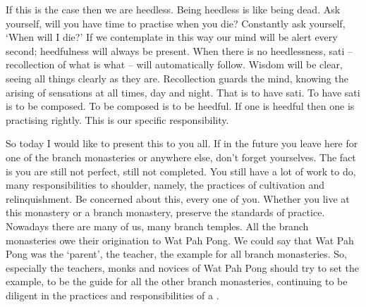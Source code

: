 If this is the case then we are heedless. Being heedless is like being dead. Ask yourself, will you have time to practise when you die? Constantly ask yourself, `When will I die?' If we contemplate in this way our mind will be alert every second; heedfulness will always be present. When there is no heedlessness, sati -- recollection of what is what -- will automatically follow. Wisdom will be clear, seeing all things clearly as they are. Recollection guards the mind, knowing the arising of sensations at all times, day and night. That is to have sati. To have sati is to be composed. To be composed is to be heedful. If one is heedful then one is practising rightly. This is our specific responsibility. 

So today I would like to present this to you all. If in the future you leave here for one of the branch monasteries or anywhere else, don't forget yourselves. The fact is you are still not perfect, still not completed. You still have a lot of work to do, many responsibilities to shoulder, namely, the practices of cultivation and relinquishment. Be concerned about this, every one of you. Whether you live at this monastery or a branch monastery, preserve the standards of practice. Nowadays there are many of us, many branch temples. All the branch monasteries owe their origination to Wat Pah Pong. We could say that Wat Pah Pong was the `parent', the teacher, the example for all branch monasteries. So, especially the teachers, monks and novices of Wat Pah Pong should try to set the example, to be the guide for all the other branch monasteries, continuing to be diligent in the practices and responsibilities of a . 


